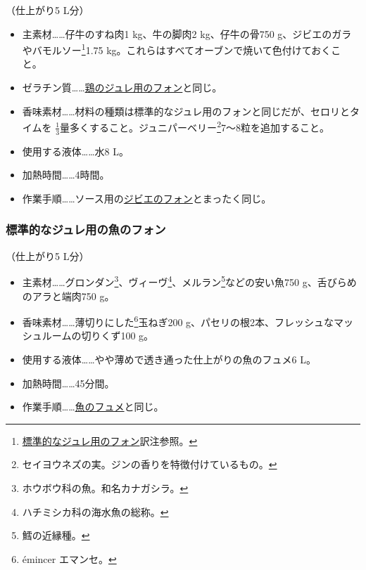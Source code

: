 \begin{recette}
（仕上がり5 L分）

\begin{itemize}
\item
  主素材\ldots{}\ldots{}仔牛のすね肉1 kg、牛の脚肉2 kg、仔牛の骨750
  g、ジビエのガラやバモルソー\footnote{\protect\hyperlink{fonds-pour-gelee-ordinaire}{標準的なジュレ用のフォン}訳注参照。}1.75
  kg。これらはすべてオーブンで焼いて色付けておくこと。
\item
  ゼラチン質\ldots{}\ldots{}\protect\hyperlink{fonds-pour-gelee-de-volaille}{鶏のジュレ用のフォン}と同じ。
\item
  香味素材\ldots{}\ldots{}材料の種類は標準的なジュレ用のフォンと同じだが、セロリとタイムを
  \(\frac{1}{3}\)量多くすること。ジュニパーベリー\footnote{セイヨウネズの実。ジンの香りを特徴付けているもの。}7〜8粒を追加すること。
\item
  使用する液体\ldots{}\ldots{}水8 L。
\item
  加熱時間\ldots{}\ldots{}4時間。
\item
  作業手順\ldots{}\ldots{}ソース用の\protect\hyperlink{fonds-de-gibier}{ジビエのフォン}とまったく同じ。
\end{itemize}

\atoaki{}

\hypertarget{fonds-de-poisson-pour-gelee-ordinaire}{%
\subsubsection{標準的なジュレ用の魚のフォン}\label{fonds-de-poisson-pour-gelee-ordinaire}}



（仕上がり5 L分）

\begin{itemize}
\item
  主素材\ldots{}\ldots{}グロンダン\footnote{ホウボウ科の魚。和名カナガシラ。}、ヴィーヴ\footnote{ハチミシカ科の海水魚の総称。}、メルラン\footnote{鱈の近縁種。}などの安い魚750
  g、舌びらめのアラと端肉750 g。
\item
  香味素材\ldots{}\ldots{}薄切りにした\footnote{émincer エマンセ。}玉ねぎ200
  g、パセリの根2本、フレッシュなマッシュルームの切りくず100 g。
\item
  使用する液体\ldots{}\ldots{}やや薄めで透き通った仕上がりの魚のフュメ6
  L。
\item
  加熱時間\ldots{}\ldots{}45分間。
\item
  作業手順\ldots{}\ldots{}\protect\hyperlink{fumet-de-poisson}{魚のフュメ}と同じ。
\end{itemize}


\end{recette}
